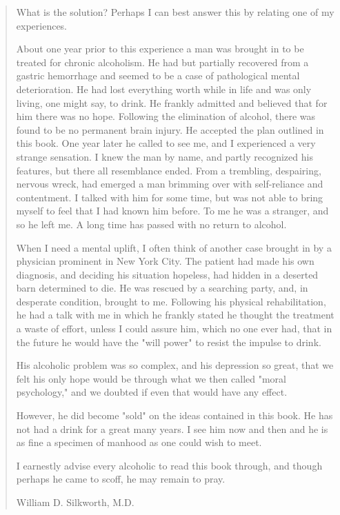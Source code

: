 \begin{quote}
What is the solution? 
Perhaps I can best answer this by relating one of my experiences.

About one year prior to this experience a man was brought in to be treated for chronic alcoholism. 
He had but partially recovered from a gastric hemorrhage and seemed to be a case of pathological mental deterioration. 
He had lost everything worth while in life and was only living, one might say, to drink. 
He frankly admitted and believed that for him there was no hope. 
Following the elimination of alcohol, there was found to be no permanent brain injury. 
He accepted the plan outlined in this book. 
One year later he called to see me, and I experienced a very strange sensation. 
I knew the man by name, and partly recognized his features, but there all resemblance ended. 
From a trembling, despairing, nervous wreck, had emerged a man brimming over with self-reliance and contentment. 
I talked with him for some time, but was not able to bring myself to feel that I had known him before. 
To me he was a stranger, and so he left me. 
A long time has passed with no return to alcohol.

When I need a mental uplift, I often think of another case brought in by a physician prominent in New York City. 
The patient had made his own diagnosis, and deciding his situation hopeless, had hidden in a deserted barn determined to die. 
He was rescued by a searching party, and, in desperate condition, brought to me. 
Following his physical rehabilitation, he had a talk with me in which he frankly stated he thought the treatment a waste of effort, unless I could assure him, which no one ever had, that in the future he would have the "will power" to resist the impulse to drink.

His alcoholic problem was so complex, and his depression so great, that we felt his only hope would be through what we then called "moral psychology," and we doubted if even that would have any effect.

However, he did become "sold" on the ideas contained in this book. 
He has not had a drink for a great many years. 
I see him now and then and he is as fine a specimen of manhood as one could wish to meet.

I earnestly advise every alcoholic to read this book through, and though perhaps he came to scoff, he may remain to pray.

William D. Silkworth, M.D.
\end{quote}

